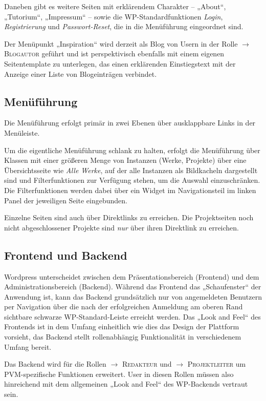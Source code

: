 \documentclass[a4paper,11pt]{article}
\newcommand{\glossar}[1]{{$\to$ \textsc{#1}}}
\begin{document}
Daneben gibt es weitere Seiten mit erklärendem Charakter -- „About“,
„Tutorium“, „Impressum“ -- sowie die WP-Standardfunktionen \emph{Login},
\emph{Registrierung} und \emph{Passwort-Reset}, die in die Menüführung
eingeordnet sind.

Der Menüpunkt „Inspiration“ wird derzeit als Blog von Usern in der Rolle
\glossar{Blogautor} geführt und ist perspektivisch ebenfalls mit einem eigenen
Seitentemplate zu unterlegen, das einen erklärenden Einstiegstext mit der
Anzeige einer Liste von Blogeinträgen verbindet. 

\subsection{Menüführung}

Die Menüführung erfolgt primär in zwei Ebenen über ausklappbare Links in der
Menüleiste.

Um die eigentliche Menüführung schlank zu halten, erfolgt die Menüführung über
Klassen mit einer größeren Menge von Instanzen (Werke, Projekte) über eine
Übersichtsseite wie \emph{Alle Werke}, auf der alle Instanzen als Bildkacheln
dargestellt sind und Filterfunktionen zur Verfügung stehen, um die Auswahl
einzuschränken. Die Filterfunktionen werden dabei über ein Widget im
Navigationsteil im linken Panel der jeweiligen Seite eingebunden.

Einzelne Seiten sind auch über Direktlinks zu erreichen.  Die Projektseiten
noch nicht abgeschlossener Projekte sind \emph{nur} über ihren Direktlink zu
erreichen.

\subsection{Frontend und Backend}

Wordpress unterscheidet zwischen dem Präsentationsbereich (Frontend) und dem
Administrationsbereich (Backend).  Während das Frontend das „Schaufenster“ der
Anwendung ist, kann das Backend grundsätzlich nur von angemeldeten Benutzern
per Navigation über die nach der erfolgreichen Anmeldung am oberen Rand
sichtbare schwarze WP-Standard-Leiste erreicht werden.  Das „Look and Feel“ des
Frontends ist in dem Umfang einheitlich wie dies das Design der Plattform
vorsieht, das Backend stellt rollenabhängig Funktionalität in verschiedenem
Umfang bereit.

Das Backend wird für die Rollen \glossar{Redakteur} und \glossar{Projektleiter}
um PVM-spezifische Funktionen erweitert.  User in diesen Rollen müssen also
hinreichend mit dem allgemeinen „Look and Feel“ des WP-Backends vertraut sein.
\end{document}
